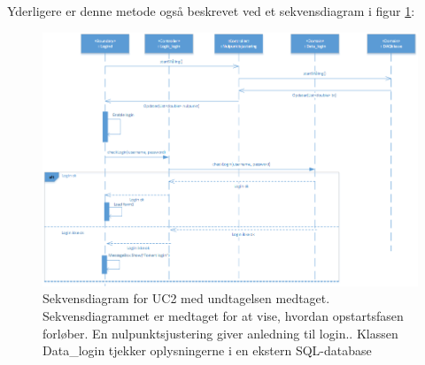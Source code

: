  Yderligere er denne metode også beskrevet ved et sekvensdiagram i figur \ref{UC2sekvens}:
 
\begin{figure}[H]
	\includegraphics[width=1\textwidth]{Figurer/Softwareimplementering/Login_sekvens}
	\caption{Sekvensdiagram for UC2 med undtagelsen medtaget. Sekvensdiagrammet er medtaget for at vise, hvordan opstartsfasen forløber. En nulpunktsjustering giver anledning til login.. Klassen Data\_login tjekker oplysningerne i en ekstern SQL-database}
	\label{UC2sekvens}
\end{figure}
 







